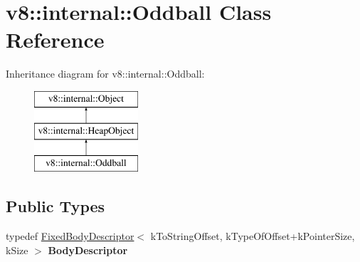 \hypertarget{classv8_1_1internal_1_1Oddball}{}\section{v8\+:\+:internal\+:\+:Oddball Class Reference}
\label{classv8_1_1internal_1_1Oddball}
Inheritance diagram for v8\+:\+:internal\+:\+:Oddball\+:\begin{figure}[H]
\begin{center}
\leavevmode
\includegraphics[height=3.000000cm]{classv8_1_1internal_1_1Oddball}
\end{center}
\end{figure}
\subsection*{Public Types}
\begin{DoxyCompactItemize}
\item 
\mbox{\label{classv8_1_1internal_1_1Oddball_a45d95a2cd4e1df3c4e74b41286dd61b8}} 
typedef \mbox{\hyperlink{classv8_1_1internal_1_1FixedBodyDescriptor}{Fixed\+Body\+Descriptor}}$<$ k\+To\+String\+Offset, k\+Type\+Of\+Offset+k\+Pointer\+Size, k\+Size $>$ {\bfseries Body\+Descriptor}
\end{DoxyCompactItemize}
